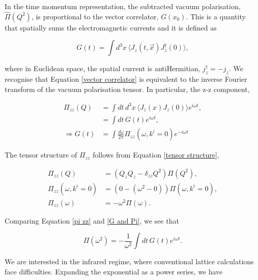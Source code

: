 \documentclass{article}
\numberwithin{equation}{section} %
\begin{document}
In the time momentum representation, the subtracted vacuum polarisation, $\hat{\Pi}(Q^2)$, is proportional to the vector correlator, $G(x_0)$. This is a quantity that spatially sums the electromagnetic currents and it is defined as

\begin{equation}
G(t) = \int d^3x \, \langle J_z(t,\vec{x})J_z^\dag(0)\rangle,
\label{vector correlator}
\end{equation}

\noindent where in Euclidean space, the spatial current is antiHermitian, $j^\dag_z=-j_z$\cite{vector}. We recognise that Equation \ref{vector correlator} is equivalent to the inverse Fourier transform of the vacuum polarisation tensor. In particular, the z-z component,

\begin{equation}
\begin{split}
\Pi_{zz}(Q) &= \int dt\,d^3x \, \langle J_z(x) J_z(0)\rangle e^{i\omega t},\\
&= \int dt \, G(t) e^{i\omega t},\\
\Rightarrow G(t) &= \int \frac{d\omega}{2\pi} \Pi_{zz}(\omega,k^i=0)e^{-i\omega t}
\end{split}
\label{G and Pi}
\end{equation}

\noindent The tensor structure of $\Pi_{zz}$ follows from Equation \ref{tensor structure},

\begin{equation}
\begin{split}
\Pi_{zz}(Q) &=\left(Q_z Q_z - \delta_{zz}Q^2 \right)\Pi(Q^2),\\
\Pi_{zz}(\omega,k^i=0) &=\left(0 - (\omega^2 - 0) \right)\Pi(\omega,k^i=0),\\
\Pi_{zz}(\omega) &= -\omega^2\Pi(\omega).
\end{split}
\label{pi zz}
\end{equation}

\noindent Comparing Equation \ref{pi zz} and \ref{G and Pi}, we see that 

\begin{equation}
\Pi(\omega^2)= -\frac{1}{\omega^2}\int dt \, G(t) e^{i\omega t}.
\label{hvp - correlator}
\end{equation}

We are interested in the infrared regime, where conventional lattice calculations face difficulties. Expanding the exponential as a power series, we have
\end{document}
